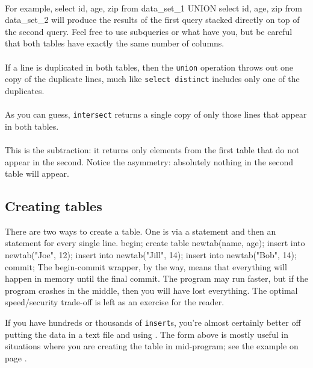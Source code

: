 \paragraph{} For example, 
select id, age, zip
from data_set_1
UNION
select id, age, zip
from data_set_2
will produce the results of the first query stacked directly on top of
the second query. Feel free to use subqueries or what have you, but be
careful that both tables have exactly the same number of columns.

\paragraph{} If a line is duplicated in both tables,
then the {\tt union} operation throws out
one copy of the duplicate lines, much like {\tt select distinct}
includes only one of the duplicates.

\paragraph{} As you can guess, {\tt intersect} returns
a single copy of only those lines that appear in both tables.

\paragraph{} This is the subtraction: it returns only
elements from the first table that do not appear in the second. Notice
the asymmetry: absolutely nothing in the second table will appear. 

\subsection{Creating tables} There are two ways to create a table. One
is via  a  statement and then an  statement
for every single line. 
begin;
create table newtab(name, age);
insert into newtab("Joe", 12);
insert into newtab("Jill", 14);
insert into newtab("Bob", 14);
commit;
The begin-commit wrapper, by the way, means that everything will happen
in memory until the final commit. The program may run faster, but if
the program crashes in the middle, then you will have lost everything.
The optimal speed/security trade-off is left as an exercise for the
reader.

If you have hundreds or thousands of {\tt insert}s, you're almost certainly better off putting the data
in a text file and using . The form
above is mostly useful in situations where you are creating the table in mid-program; see the example on page \pageref{createeg}.


